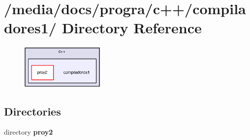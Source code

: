 \section{/media/docs/progra/c++/compiladores1/ Directory Reference}
\label{dir_000004}


\begin{figure}[H]
\begin{center}
\leavevmode
\includegraphics[width=118pt]{dir_000004_dep}
\end{center}
\end{figure}
\subsection*{Directories}
\begin{CompactItemize}
\item 
directory {\bf proy2}
\end{CompactItemize}
